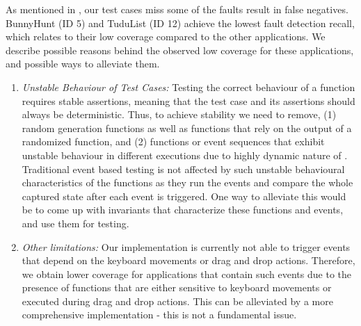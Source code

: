  As mentioned in , our test cases miss some of the faults \ie result in false negatives. 
BunnyHunt (ID 5) and TuduList (ID 12) achieve the lowest fault detection recall, which relates to their low coverage compared to the other applications. 
We describe possible reasons behind the observed low coverage for these applications, and possible ways to alleviate them.  
\begin{enumerate}
\item \textit{Unstable Behaviour of Test Cases:} Testing the correct behaviour of a function requires stable assertions, meaning that
 the test case and its assertions should always be deterministic. 
Thus, to achieve stability we need to remove, (1)  random generation functions as well as functions that rely on the output of a randomized function, and (2) functions or event sequences that exhibit unstable behaviour in different executions due to highly dynamic nature of \javascript. 
Traditional event based testing is not affected by such unstable behavioural characteristics of the functions as they run the events and compare the whole captured state after each event is triggered. One way to alleviate this would be to come up with invariants that characterize these functions and events, and use them for testing.

\item \textit{Other limitations:} Our implementation is currently not able to trigger events that depend on the keyboard movements or drag and drop actions. 
Therefore, we obtain lower coverage for applications that contain such events due to the presence of functions that are either sensitive to keyboard movements or executed during drag and drop actions. This can be alleviated by a more comprehensive implementation - this is not a fundamental issue.
\end{enumerate}  


      